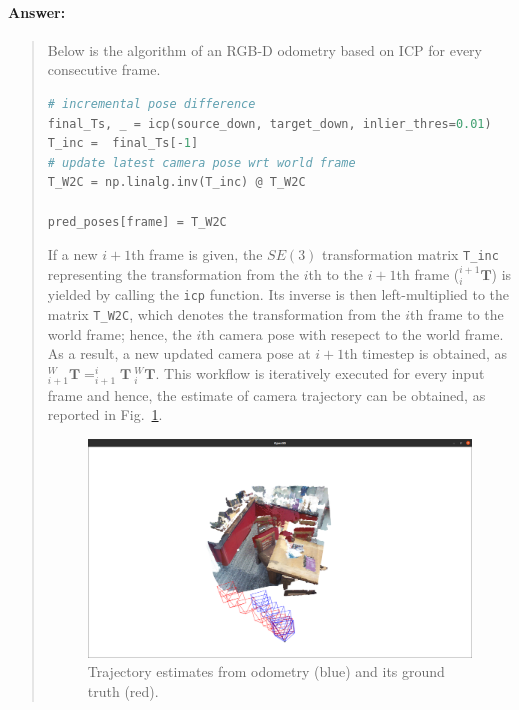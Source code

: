 \documentclass[11pt]{article}
\begin{document}
\paragraph{Answer:} 
\begin{quote}

Below is the algorithm of an RGB-D odometry based on ICP for every consecutive frame.

\begin{lstlisting}[language=Python, basicstyle=\small]
# incremental pose difference
final_Ts, _ = icp(source_down, target_down, inlier_thres=0.01)
T_inc =  final_Ts[-1]
# update latest camera pose wrt world frame
T_W2C = np.linalg.inv(T_inc) @ T_W2C

pred_poses[frame] = T_W2C
\end{lstlisting}

If a new $i+1$th frame is given, the $SE(3)$ transformation matrix \texttt{T\_inc} representing the transformation from the $i$th to the $i+1$th frame ($^{i+1}_{i}\mathbf{T}$) is yielded by calling the \texttt{icp} function. Its inverse is then left-multiplied to the matrix \texttt{T\_W2C}, which denotes the transformation from the $i$th frame to the world frame; hence, the $i$th camera pose with resepect to the world frame. As a result, a new updated camera pose at $i+1$th timestep is obtained, as $^{W}_{i+1}\mathbf{T} = ^{i}_{i+1}\mathbf{T} ~ ^{W}_{i}\mathbf{T}$. This workflow is iteratively executed for every input frame and hence, the estimate of camera trajectory can be obtained, as reported in Fig.~\ref{fig:gt_odom}.

\begin{figure}[h]
    \centering
    \includegraphics[width=1.0\linewidth]{gt_odom.png}
    \caption{Trajectory estimates from odometry (blue) and its ground truth (red).}
    \label{fig:gt_odom}
\end{figure}

\end{quote}
\end{document}
